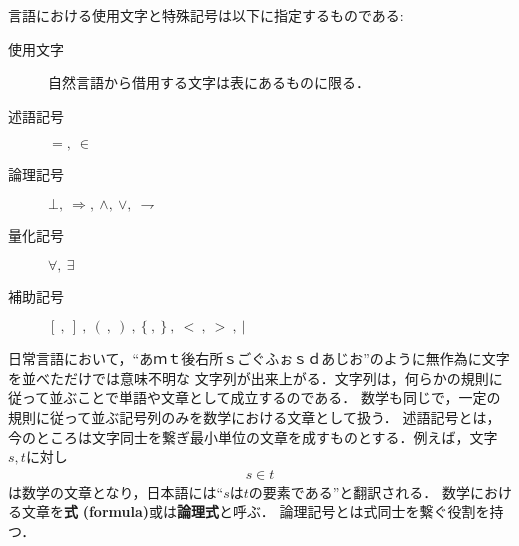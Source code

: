 	
	言語における使用文字と特殊記号は以下に指定するものである:
	\begin{description}
		\item[使用文字] 自然言語から借用する文字は表にあるものに限る．
		\item[述語記号] $=,\ \in$
		\item[論理記号] $\bot,\ \Longrightarrow,\ \wedge,\ \vee,\ \rightharpoondown$
		\item[量化記号] $\forall,\ \exists$
		\item[補助記号] $[\ ,\ ]\ ,\ (\ ,\ )\ ,\ \{\ ,\ \}\ ,\ <\ ,\ >\ ,\ |$
	\end{description}
	
	日常言語において，``あｍｔ後右所ｓごぐふぉｓｄあじお''のように無作為に文字を並べただけでは意味不明な
	文字列が出来上がる．文字列は，何らかの規則に従って並ぶことで単語や文章として成立するのである．
	数学も同じで，一定の規則に従って並ぶ記号列のみを数学における文章として扱う．
	述語記号とは，今のところは文字同士を繋ぎ最小単位の文章を成すものとする．例えば，文字$s,t$に対し
	\begin{align}
		s \in t
	\end{align}
	は数学の文章となり，日本語には``$s$は$t$の要素である''と翻訳される．
	数学における文章を{\bf 式}
	{\bf (formula)}或は{\bf 論理式}と呼ぶ．
	論理記号とは式同士を繋ぐ役割を持つ．
	
